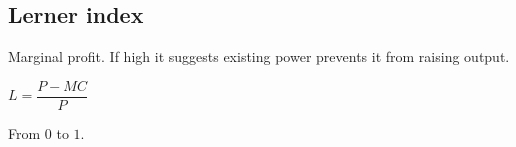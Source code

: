 
\subsection{Lerner index}

Marginal profit. If high it suggests existing power prevents it from raising output.

\(L=\dfrac{P-MC}{P}\)

From \(0\) to \(1\).

